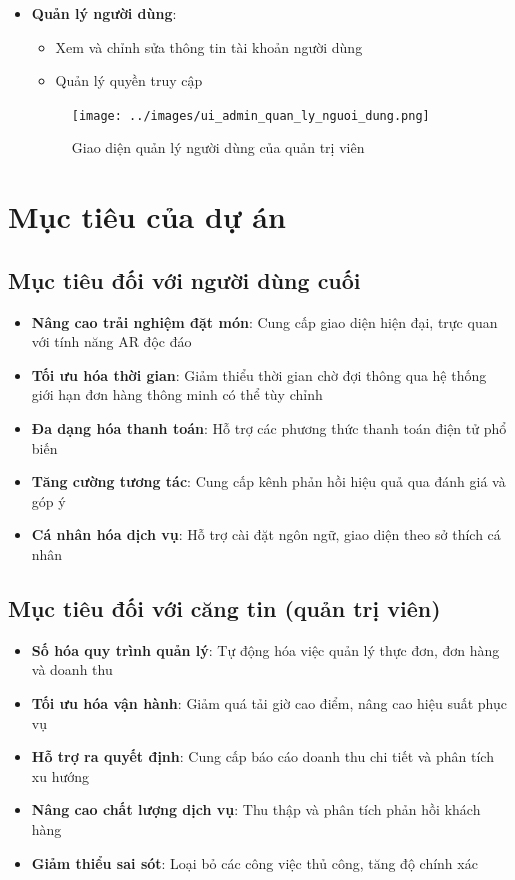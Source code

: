 \documentclass[12pt,a4paper]{article}
\begin{document}
\begin{itemize}[leftmargin=1cm]
    \item \textbf{Quản lý người dùng}:
        \begin{itemize}[leftmargin=0.5cm]
            \item Xem và chỉnh sửa thông tin tài khoản người dùng
            \item Quản lý quyền truy cập
        \end{itemize}
\begin{figure}[H]
    \centering
    \texttt{[image: ../images/ui\_admin\_quan\_ly\_nguoi\_dung.png]} %
    \caption{Giao diện quản lý người dùng của quản trị viên}
    \label{fig:ui_admin_users}
\end{figure}
\end{itemize}

\section{Mục tiêu của dự án}

\subsection{Mục tiêu đối với người dùng cuối}
\begin{itemize}[leftmargin=1cm]
    \item \textbf{Nâng cao trải nghiệm đặt món}: Cung cấp giao diện hiện đại, trực quan với tính năng AR độc đáo
    \item \textbf{Tối ưu hóa thời gian}: Giảm thiểu thời gian chờ đợi thông qua hệ thống giới hạn đơn hàng thông minh có thể tùy chỉnh
    \item \textbf{Đa dạng hóa thanh toán}: Hỗ trợ các phương thức thanh toán điện tử phổ biến
    \item \textbf{Tăng cường tương tác}: Cung cấp kênh phản hồi hiệu quả qua đánh giá và góp ý
    \item \textbf{Cá nhân hóa dịch vụ}: Hỗ trợ cài đặt ngôn ngữ, giao diện theo sở thích cá nhân
\end{itemize}

\subsection{Mục tiêu đối với căng tin (quản trị viên)}
\begin{itemize}[leftmargin=1cm]
    \item \textbf{Số hóa quy trình quản lý}: Tự động hóa việc quản lý thực đơn, đơn hàng và doanh thu
    \item \textbf{Tối ưu hóa vận hành}: Giảm quá tải giờ cao điểm, nâng cao hiệu suất phục vụ
    \item \textbf{Hỗ trợ ra quyết định}: Cung cấp báo cáo doanh thu chi tiết và phân tích xu hướng
    \item \textbf{Nâng cao chất lượng dịch vụ}: Thu thập và phân tích phản hồi khách hàng
    \item \textbf{Giảm thiểu sai sót}: Loại bỏ các công việc thủ công, tăng độ chính xác
\end{itemize}
\end{document}
